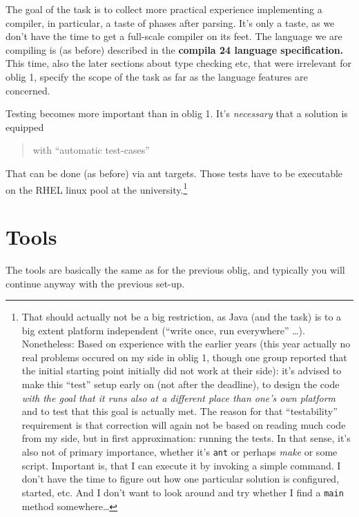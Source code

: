 \documentclass[11pt,freeform]{handout}[2014/08/13]
\begin{document}
The goal of the task is to collect more practical experience implementing a
compiler, in particular, a taste of phases after parsing. It's only a
taste, as we don't have the time to get a full-scale compiler on its
feet. The language we are compiling is (as before) described in the
\textbf{compila 24 language specification.} This time, also the later
sections about type checking etc, that were irrelevant for oblig 1, specify
the scope of the task as far as the language features are concerned.


Testing becomes more important than in oblig 1. It's \emph{necessary} that
a solution is equipped


\begin{quote}
  with ``automatic test-cases''
\end{quote}

That can be done (as before) via ant targets. Those tests have to be
executable on the RHEL linux pool at the university.\footnote{That should
  actually not be a big restriction, as Java (and the task) is to a big
  extent platform independent (``write once, run everywhere''
  \ldots). Nonetheless: Based on experience with the earlier years (this
  year actually no real problems occured on my side in oblig 1, though one
  group reported that the initial starting point initially did not work at
  their side): it's advised to make this ``test'' setup early on (not after
  the deadline), to design the code \emph{with the goal that it runs also
    at a different place than one's own platform} and to test that this
  goal is actually met. The reason for that ``testability'' requirement is
  that correction will again not be based on reading much code from my
  side, but in first approximation: running the tests. In that sense, it's
  also not of primary importance, whether it's \texttt{ant} or perhaps
  \emph{make} or some script. Important is, that I can execute it by
  invoking a simple command.  I don't have the time to figure out how one
  particular solution is configured, started, etc. And I don't want to look
  around and try whether I find a \texttt{main} method somewhere\ldots }


\section{Tools}


The tools are basically the same as for the previous oblig, and typically
you will continue anyway with the previous set-up. 
\end{document}
